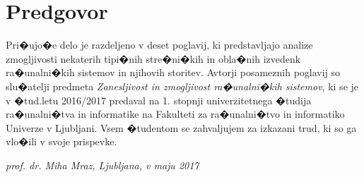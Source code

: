 
\chapter{Predgovor}


Pri�ujo�e delo je razdeljeno v deset poglavij, ki predstavljajo analize zmogljivosti nekaterih tipi�nih stre�ni�kih in obla�nih izvedenk ra�unalni�kih sistemov in njihovih storitev. Avtorji posameznih poglavij so slu�atelji predmeta \textit{Zanesljivost in zmogljivost ra�unalni�kih sistemov}, ki se je v �tud.letu 2016/2017 predaval na 1. stopnji univerzitetnega �tudija ra�unalni�tva in informatike na Fakulteti za ra�unalni�tvo in informatiko Univerze v Ljubljani. Vsem �tudentom se zahvaljujem za izkazani trud, ki so ga vlo�ili v svoje prispevke.

\begin{flushright}
\textit{prof. dr. Miha Mraz, Ljubljana, v maju 2017}
\end{flushright}
